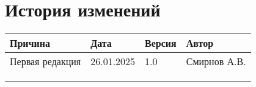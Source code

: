 \newpage


\section*{История изменений}
\noindent

\scriptsize
\begin{longtable}{|p{40mm}|p{20mm}|p{20mm}|p{60mm}|}
\hline
{\bf \parbox[c][5mm]{40mm}{\centering Причина}} & {\bf \parbox[c]{19mm}{\centering Дата}} & {\bf \parbox[c]{16mm}{\centering Версия}} & {\bf \parbox[c]{25mm}{\centering Автор}} \\
\hline
\parbox[c][9mm]{40mm}{Первая редакция} & \parbox{19mm}{26.01.2025} & \parbox{16mm}{1.0} & \parbox{60mm}{Смирнов А.В.} \\
\hline
&&&\\
\hline
&&&\\
\hline
&&&\\
\hline
\end{longtable}  
\normalsize
